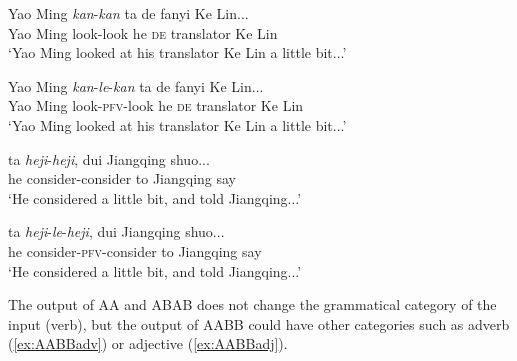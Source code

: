 \settowidth{}

\ea\label{ex:le-insertionAA}
  \ea \gll Yao Ming \textit{kan}-\textit{kan} ta de fanyi Ke Lin...\\
  Yao Ming look-look he \textsc{de} translator Ke Lin\\
  \glt `Yao Ming looked at his translator Ke Lin a little bit...'
  
  \ex \gll Yao Ming \textit{kan}-\textit{le}-\textit{kan} ta de fanyi Ke Lin...\\
  Yao Ming look-\textsc{pfv}-look he \textsc{de} translator Ke Lin\\ 
  \glt `Yao Ming looked at his translator Ke Lin a little bit...'
  \z
\z

\ea\label{ex:le-insertionABAB}
  \ea \gll ta \textit{heji}-\textit{heji}, dui Jiangqing shuo...\\
  he consider-consider to Jiangqing say\\
 \glt `He considered a little bit, and told Jiangqing...'
 
  \ex \gll ta \textit{heji}-\textit{le}-\textit{heji}, dui Jiangqing shuo...\\
  he consider-\textsc{pfv}-consider to Jiangqing say\\ 
  \glt `He considered a little bit, and told Jiangqing...'
  \z
\z

\ea\label{ex:le-insertionAABB}
  
  \z
\z

The output of AA and ABAB does not change the grammatical category of the input (verb), but the output of AABB could have other categories such as adverb (\ref{ex:AABBadv}) or adjective (\ref{ex:AABBadj}).

\ea\label{ex:AABBadv}
  
